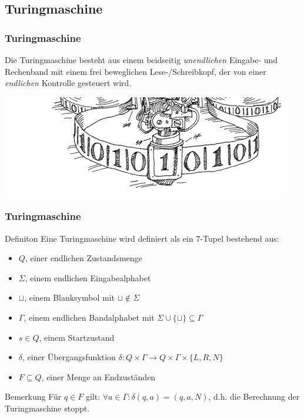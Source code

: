 \subsection{Turingmaschine}
\begin{frame}
	\frametitle{Turingmaschine}
	Die Turingmaschine besteht aus einem beidseitig \emph{unendlichen} Eingabe- und Rechenband
	mit einem frei beweglichen Lese-/Schreibkopf, der von einer \emph{endlichen} Kontrolle gesteuert wird. 
	\begin{center}
		\includegraphics[scale=0.5]{images/tmaschine.png}
	\end{center}
\end{frame}
\begin{frame}
\frametitle{Turingmaschine}
\begin{block}{Definiton}
Eine Turingmaschine wird definiert als ein 7-Tupel bestehend aus:
 \begin{itemize}
 \item $Q$, einer endlichen Zustandsmenge
 \item $\Sigma$, einem endlichen Eingabealphabet
 \item $\sqcup$, einem Blanksymbol mit $\sqcup \notin \Sigma$
 \item $\Gamma$, einem endlichen Bandalphabet mit $\Sigma \cup\{\sqcup\} \subseteq \Gamma$
 \item $s \in Q$, einem Startzustand
 \item $\delta$, einer Übergangsfunktion $\delta: Q\times\Gamma \rightarrow Q\times\Gamma\times\{L, R, N\}$
 \item $F \subseteq Q$, einer Menge an Endzuständen
 \end{itemize}
\end{block}
\begin{block}{Bemerkung}
 Für $q\in F$ gilt: $\forall a \in \Gamma: \delta(q, a) = (q, a, N)$, d.h. die Berechnung der Turingmaschine stoppt.
\end{block}
\end{frame}

